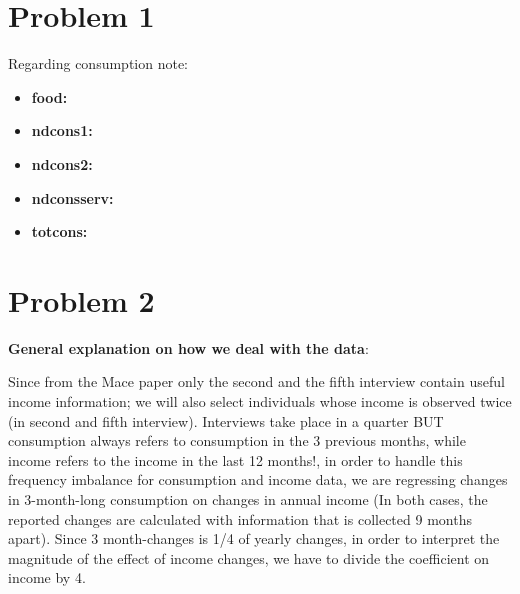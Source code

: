 \documentclass[12pt,a4paper]{article}
\begin{document}
\newpage


\section*{Problem 1}

Regarding consumption note:
\begin{itemize}
    \item \textbf{food:} 
    \item \textbf{ndcons1:} 
    \item \textbf{ndcons2:} 
    \item \textbf{ndconsserv:} 
    \item \textbf{totcons:} 
\end{itemize}


\section*{Problem 2}

\textbf{General explanation on how we deal with the data}:

Since from the Mace paper only the second and the fifth interview contain useful income information; we will also select individuals whose income is observed twice (in second and fifth interview).
Interviews take place in a quarter BUT consumption always refers to consumption in the 3 previous months, while income refers to the income in the last 12 months!, in order to handle this frequency imbalance for consumption and income data, we are regressing changes in 3-month-long consumption on changes in annual income (In both cases, the reported changes are calculated with information that is collected 9 months apart). Since 3 month-changes is 1/4 of yearly changes, in order to interpret the magnitude of the effect of income changes, we have to divide the coefficient on income by 4.
\end{document}
